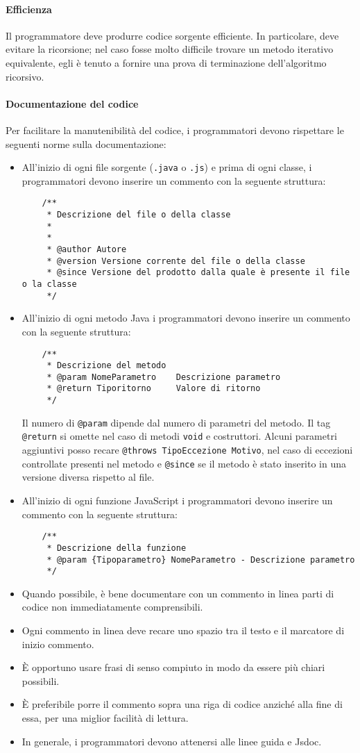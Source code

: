 \paragraph{Efficienza} \label{sec:efficienza} Il programmatore deve produrre codice sorgente efficiente. In particolare, deve evitare la ricorsione; nel caso fosse molto difficile trovare un metodo iterativo equivalente, egli è tenuto a fornire una prova di terminazione dell'algoritmo ricorsivo.

\paragraph{Documentazione del codice} Per facilitare la manutenibilità del codice, i programmatori devono rispettare le seguenti norme sulla documentazione:
\begin{itemize}
	\item All'inizio di ogni file sorgente (\texttt{.java} o \texttt{.js}) e prima di ogni classe, i programmatori devono inserire un commento con la seguente struttura:
	\begin{verbatim}
	/**
	 * Descrizione del file o della classe
	 *
	 *
	 * @author Autore
	 * @version Versione corrente del file o della classe
	 * @since Versione del prodotto dalla quale è presente il file o la classe
	 */
	\end{verbatim}
	\item All'inizio di ogni metodo Java i programmatori devono inserire un commento con la seguente struttura:
	\begin{verbatim}
	/** 
	 * Descrizione del metodo
	 * @param NomeParametro    Descrizione parametro
	 * @return Tiporitorno     Valore di ritorno 
	 */
	\end{verbatim}
	Il numero di \texttt{@param} dipende dal numero di parametri del metodo. Il tag \texttt{@return} si omette nel caso di metodi \texttt{void} e costruttori. Alcuni parametri aggiuntivi posso recare \texttt{@throws TipoEccezione Motivo}, nel caso di eccezioni controllate presenti nel metodo e \texttt{@since} se il metodo è stato inserito in una versione diversa rispetto al file.
	\item All'inizio di ogni funzione JavaScript i programmatori devono inserire un commento con la seguente struttura:
	\begin{verbatim}
	/** 
	 * Descrizione della funzione
	 * @param {Tipoparametro} NomeParametro - Descrizione parametro
	 */
	\end{verbatim}
	\item Quando possibile, è bene documentare con un commento in linea parti di codice non immediatamente comprensibili.
	\item Ogni commento in linea deve recare uno spazio tra il testo e il marcatore di inizio commento.
	\item È opportuno usare frasi di senso compiuto in modo da essere più chiari possibili.
	\item È preferibile porre il commento sopra una riga di codice anziché alla fine di essa, per una miglior facilità di lettura.
	\item In generale, i programmatori devono attenersi alle linee guida  e Jsdoc.
\end{itemize}

